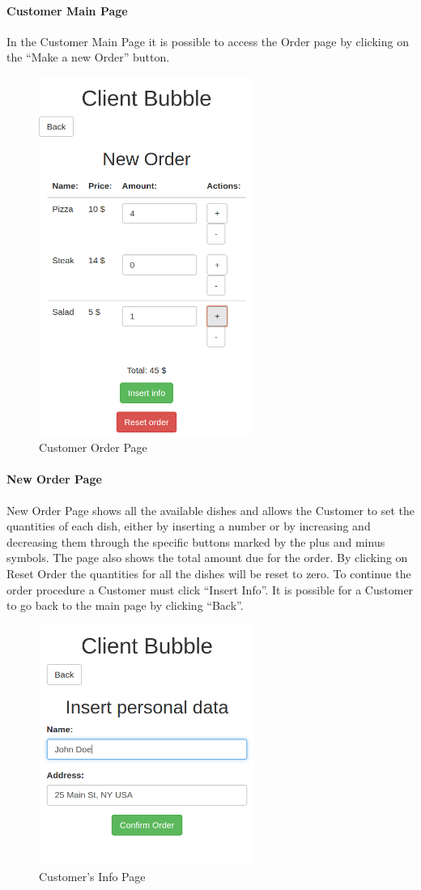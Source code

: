 \paragraph{Customer Main Page}
In the Customer Main Page it is possible to access the Order page by clicking on the ``Make a new Order'' button.
\begin{figure}[H]
	\centering
	\includegraphics[width=7cm]{../../documenti/UserManualDemo/demo_screens/client_dishes.png}
	\caption{Customer Order Page}
\end{figure}
\paragraph{New Order Page}
New Order Page shows all the available dishes and allows the Customer to set the quantities of each dish, either by inserting a number or by increasing and decreasing them through the specific buttons marked by the plus and minus symbols. The page also shows the total amount due for the order.
By clicking on Reset Order the quantities for all the dishes will be reset to zero.
To continue the order procedure a Customer must click ``Insert Info''. 
It is possible for a Customer to go back to the main page by clicking ``Back''.

\begin{figure}[H]
	\centering
	\includegraphics[width=7cm]{../../documenti/UserManualDemo/demo_screens/client_info.png}
	\caption{Customer's Info Page}
\end{figure}
